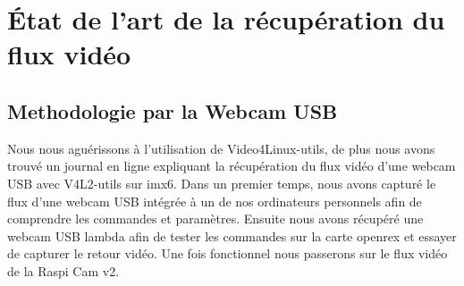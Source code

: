 
\chapter{État de l'art de la récupération du flux vidéo} %

\label{Chapter5} %


\section{Methodologie par la Webcam USB}

Nous nous aguérissons à l’utilisation de Video4Linux-utils, de plus nous avons trouvé
un journal en ligne expliquant la récupération du flux vidéo d’une webcam USB avec
V4L2-utils sur imx6. Dans un premier temps, nous avons capturé le flux d’une
webcam USB intégrée à un de nos ordinateurs personnels afin de comprendre les commandes
et paramètres. Ensuite nous avons récupéré une webcam USB lambda afin de tester les commandes
sur la carte openrex et essayer de capturer le retour vidéo. Une fois fonctionnel
nous passerons sur le flux vidéo de la Raspi Cam v2.

